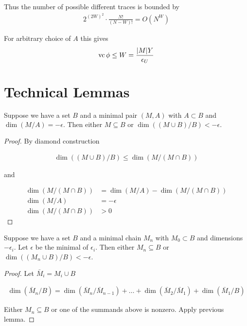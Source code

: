 \documentclass{amsart}
\begin{document}
Thus the number of possible different traces is bounded by 
\begin{align*}
	2^{(2W)^2} \cdot \frac{N!}{(N-W)!} = O(N^W)
\end{align*}

For arbitrary choice of $A$ this gives
\begin{align*}
	\operatorname{vc}{\phi} \leq W = \frac{|M|Y}{\epsilon_U}
\end{align*}

\section*{Technical Lemmas}

\begin{Lemma}
	Suppose we have a set $B$ and a minimal pair $(M, A)$ with $A \subset B$ and $\dim(M/A) = -\epsilon$.
Then either $M \subseteq B$ or $\dim((M \cup B)/B) < -\epsilon$.
\end{Lemma}

\begin{proof}
	By diamond construction

	\begin{align*}
		\dim((M \cup B)/B) \leq \dim(M / (M \cap B))
	\end{align*}

	and 

	\begin{align*}
		\dim(M / (M \cap B)) &= \dim (M/A) - \dim(M / (M \cap B)) \\
		\dim (M/A) &= -\epsilon \\
		\dim(M / (M \cap B)) &> 0
	\end{align*}
\end{proof}



\begin{Lemma}
	Suppose we have a set $B$ and a minimal chain $M_n$ with $M_0 \subset B$ and dimensions $-\epsilon_i$.
Let $\epsilon$ be the minimal of $\epsilon_i$.
Then either $M_n \subseteq B$ or $\dim((M_n \cup B)/B) < -\epsilon$.
\end{Lemma}


\begin{proof}
	Let $\bar M_i = M_i \cup B$

	\begin{align*}
		\dim(\bar M_n/B) = \dim(\bar M_n/\bar M_{n-1}) + \ldots + \dim(\bar M_2/\bar M_1) + \dim(\bar M_1/B)
	\end{align*}

	Either $M_n \subseteq B$ or one of the summands above is nonzero.
	Apply previous lemma.
\end{proof}
\end{document}
